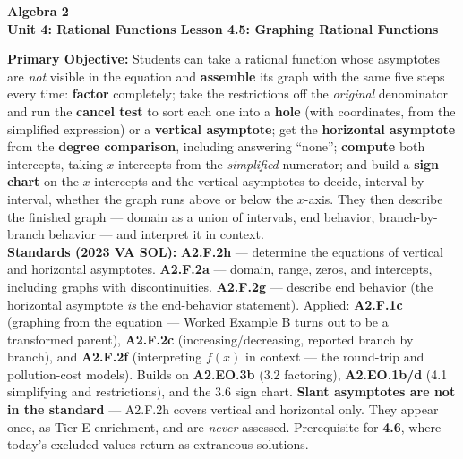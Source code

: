 \documentclass[10pt]{article}
\newcommand{\CourseName}{Algebra 2}
\newcommand{\UnitNumberName}{Unit 4: Rational Functions \quad}
\newcommand{\LessonNumberName}{Lesson 4.5: Graphing Rational Functions}
\begin{document}
\begin{center}
    {\Large\bfseries \CourseName \\
    {\small\bfseries \UnitNumberName \LessonNumberName}}
\end{center}

\begin{tcolorbox}[colback=forestbg, colframe=forest, boxrule=0.9pt, arc=2mm,
    left=2mm, right=2mm, top=1.5mm, bottom=1.5mm]
    \textbf{Primary Objective:} Students can take a rational function whose asymptotes are \emph{not}
    visible in the equation and \textbf{assemble} its graph with the same five steps every time:
    \textbf{factor} completely; take the restrictions off the \emph{original} denominator and run the
    \textbf{cancel test} to sort each one into a \textbf{hole} (with coordinates, from the simplified
    expression) or a \textbf{vertical asymptote}; get the \textbf{horizontal asymptote} from the
    \textbf{degree comparison}, including answering ``none''; \textbf{compute} both intercepts, taking
    $x$-intercepts from the \emph{simplified} numerator; and build a \textbf{sign chart} on the
    $x$-intercepts and the vertical asymptotes to decide, interval by interval, whether the graph runs
    above or below the $x$-axis. They then describe the finished graph --- domain as a union of
    intervals, end behavior, branch-by-branch behavior --- and interpret it in context.
    \\[2pt]
    \textbf{Standards (2023 VA SOL):} \textbf{A2.F.2h} --- determine the equations of vertical and
    horizontal asymptotes. \textbf{A2.F.2a} --- domain, range, zeros, and intercepts, including graphs
    with discontinuities. \textbf{A2.F.2g} --- describe end behavior (the horizontal asymptote
    \emph{is} the end-behavior statement). Applied: \textbf{A2.F.1c} (graphing from the equation ---
    Worked Example B turns out to be a transformed parent), \textbf{A2.F.2c}
    (increasing/decreasing, reported branch by branch), and \textbf{A2.F.2f} (interpreting $f(x)$ in
    context --- the round-trip and pollution-cost models). Builds on \textbf{A2.EO.3b} (3.2
    factoring), \textbf{A2.EO.1b/d} (4.1 simplifying and restrictions), and the 3.6 sign chart.
    \textbf{Slant asymptotes are not in the standard} --- A2.F.2h covers vertical and horizontal only.
    They appear once, as Tier E enrichment, and are \emph{never} assessed. Prerequisite for
    \textbf{4.6}, where today's excluded values return as extraneous solutions.
\end{tcolorbox}
\end{document}
